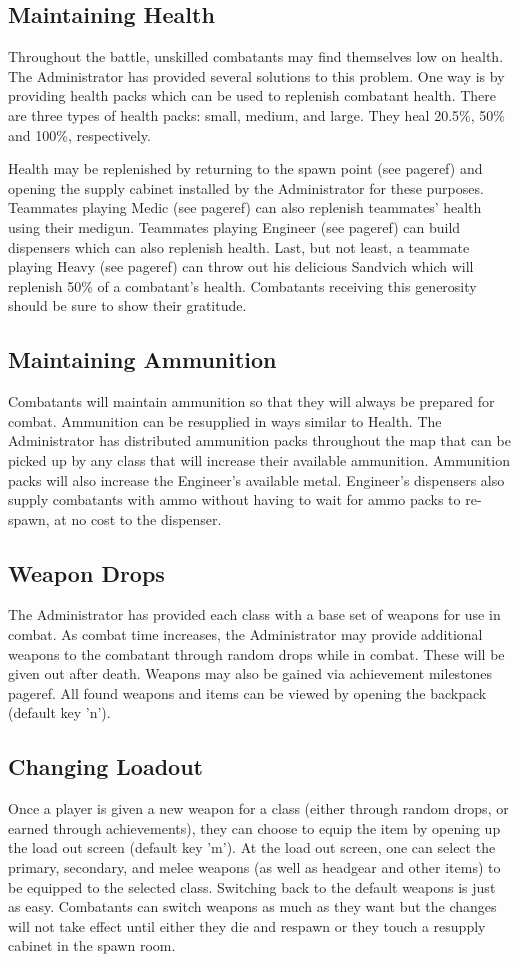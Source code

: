 \subsection{Maintaining Health}
Throughout the battle, unskilled combatants may find themselves low on health.  The Administrator has provided several solutions to this problem.  One way is by providing health packs which can be used to replenish combatant health.  There are three types of health packs: small, medium, and large.  They heal 20.5\%, 50\% and 100\%, respectively.

Health may be replenished by returning to the spawn point (see {{pageref}}) and opening the supply cabinet installed by the Administrator for these purposes. Teammates playing Medic (see {{pageref}}) can also replenish teammates' health using their medigun. Teammates playing Engineer (see {{pageref}}) can build dispensers which can also replenish health. Last, but not least, a teammate playing Heavy (see {{pageref}}) can throw out his delicious Sandvich which will replenish 50\% of a combatant's health.  Combatants receiving this generosity should be sure to show their gratitude.

\subsection{Maintaining Ammunition}
Combatants will maintain ammunition so that they will always be prepared for combat.  Ammunition can be resupplied in ways similar to Health.  The Administrator has distributed ammunition packs throughout the map that can be picked up by any class that will increase their available ammunition.  Ammunition packs will also increase the Engineer's available metal.  Engineer's dispensers also supply combatants with ammo without having to wait for ammo packs to re-spawn, at no cost to the dispenser.

\subsection{Weapon Drops}
The Administrator has provided each class with a base set of weapons for use in combat.  As combat time increases, the Administrator may provide additional weapons to the combatant through random drops while in combat. These will be given out after death.  Weapons may also be gained via achievement milestones {{pageref}}. All found weapons and items can be viewed by opening the backpack (default key 'n'). 

\subsection{Changing Loadout}
Once a player is given a new weapon for a class (either through random drops, or earned through achievements), they can choose to equip the item by opening up the load out screen (default key 'm'). At the load out screen, one can select the primary, secondary, and melee weapons (as well as headgear and other items) to be equipped to the selected class.  Switching back to the default weapons is just as easy. Combatants can switch weapons as much as they want but the changes will not take effect until either they die and respawn or they touch a resupply cabinet in the spawn room.

